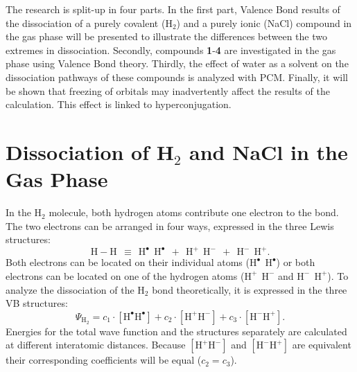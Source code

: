The research is split-up in four parts.  In the first part, Valence Bond results of the dissociation of a purely covalent (H$_2$) and a purely ionic (NaCl) compound in the gas phase will be presented to illustrate the differences between the two extremes in dissociation.
Secondly, compounds \textbf{1}-\textbf{4} are investigated in the gas phase using Valence Bond theory. Thirdly, the effect of water as a solvent on the dissociation pathways of these compounds is analyzed with PCM. Finally, it will be shown that freezing of orbitals may inadvertently affect the results of the calculation. This effect is linked to hyperconjugation.

\section{Dissociation of H$_2$ and NaCl in the Gas Phase}

In the H$_2$ molecule, both hydrogen atoms contribute one electron to the bond. The two electrons can be arranged in four ways, expressed in the three Lewis structures:
\begin{equation}
\nonumber
\mathrm{H-H\ \ \equiv \ \ H^{\bullet}\ \ H^{\bullet}\ \ +\ \ H^{+}\ \ H^{-}\ \ +\ \ H^{-}\ \ H^{+}}.
\end{equation}
Both electrons can be located on their individual atoms ($\mathrm{H^{\bullet}\ \ H^{\bullet}}$) or both electrons can be located on one of the hydrogen atoms ($\mathrm{H^{+}\ \ H^{-}}$ and $\mathrm{H^{-}\ \ H^{+}}$). To analyze the dissociation of the H$_2$ bond theoretically, it is expressed in the three VB structures:
\begin{equation}
\nonumber
\Psi_{\mathrm{H_2}} = c_1\cdot [\mathrm{H}^\bullet \mathrm{H}^\bullet] + c_2 \cdot [\mathrm{H}^{+}\mathrm{H}^{-}] + c_3 \cdot [\mathrm{H}^{-}\mathrm{H}^{+}]. 
\end{equation}
Energies for the total wave function and the structures separately are calculated at different interatomic distances. Because $[\mathrm{H}^{+}\mathrm{H}^{-}]$ and $[\mathrm{H}^{-}\mathrm{H}^{+}]$ are equivalent their corresponding coefficients will be equal ($c_2 = c_3$).  

